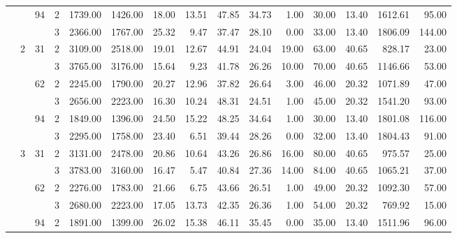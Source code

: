 \begin{tabular}{llllrrrrrrrrrrr}
\cline{3-15}
                &   & \multirow{2}{*}{94} & 2 &  1739.00 &   1426.00 & 18.00 &   13.51 &   47.85 &   34.73 &    1.00 &   30.00 &   13.40 & 1612.61 &    95.00 \\
                &   &    & 3 &  2366.00 &   1767.00 & 25.32 &    9.47 &   37.47 &   28.10 &    0.00 &   33.00 &   13.40 & 1806.09 &   144.00 \\
\cline{2-15}
\cline{3-15}
                & \multirow{6}{*}{2} & \multirow{2}{*}{31} & 2 &  3109.00 &   2518.00 & 19.01 &   12.67 &   44.91 &   24.04 &   19.00 &   63.00 &   40.65 &  828.17 &    23.00 \\
                &   &    & 3 &  3765.00 &   3176.00 & 15.64 &    9.23 &   41.78 &   26.26 &   10.00 &   70.00 &   40.65 & 1146.66 &    53.00 \\
\cline{3-15}
                &   & \multirow{2}{*}{62} & 2 &  2245.00 &   1790.00 & 20.27 &   12.96 &   37.82 &   26.64 &    3.00 &   46.00 &   20.32 & 1071.89 &    47.00 \\
                &   &    & 3 &  2656.00 &   2223.00 & 16.30 &   10.24 &   48.31 &   24.51 &    1.00 &   45.00 &   20.32 & 1541.20 &    93.00 \\
\cline{3-15}
                &   & \multirow{2}{*}{94} & 2 &  1849.00 &   1396.00 & 24.50 &   15.22 &   48.25 &   34.64 &    1.00 &   30.00 &   13.40 & 1801.08 &   116.00 \\
                &   &    & 3 &  2295.00 &   1758.00 & 23.40 &    6.51 &   39.44 &   28.26 &    0.00 &   32.00 &   13.40 & 1804.43 &    91.00 \\
\cline{2-15}
\cline{3-15}
                & \multirow{6}{*}{3} & \multirow{2}{*}{31} & 2 &  3131.00 &   2478.00 & 20.86 &   10.64 &   43.26 &   26.86 &   16.00 &   80.00 &   40.65 &  975.57 &    25.00 \\
                &   &    & 3 &  3783.00 &   3160.00 & 16.47 &    5.47 &   40.84 &   27.36 &   14.00 &   84.00 &   40.65 & 1065.21 &    37.00 \\
\cline{3-15}
                &   & \multirow{2}{*}{62} & 2 &  2276.00 &   1783.00 & 21.66 &    6.75 &   43.66 &   26.51 &    1.00 &   49.00 &   20.32 & 1092.30 &    57.00 \\
                &   &    & 3 &  2680.00 &   2223.00 & 17.05 &   13.73 &   42.35 &   26.36 &    1.00 &   54.00 &   20.32 &  769.92 &    15.00 \\
\cline{3-15}
                &   & \multirow{2}{*}{94} & 2 &  1891.00 &   1399.00 & 26.02 &   15.38 &   46.11 &   35.45 &    0.00 &   35.00 &   13.40 & 1511.96 &    96.00 \\

\end{tabular}
